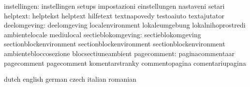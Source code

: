              instellingen: instellingen              setups
                           impostazioni              einstellungen
                           nastaveni                 setari
                 helptext: helptekst                 helptext
                           hilfetext                 textnapovedy
                           testoaiuto                textajutator
             deelomgeving: deelomgeving              localenvironment
                           lokaleumgebung            lokalnihoprostredi
                           ambientelocale            mediulocal
       sectieblokomgeving: sectieblokomgeving        sectionblockenvironment
                           sectionblockenvironment   sectionblockenvironment
                           ambientebloccosezione     blocsectiuneambient %
              pagecomment: paginacommentaar          pagecomment
                           pagecomment               komentarstranky
                           commentopagina            comentariupagina %

\stopvariables




\startvariables            dutch                     english
                           german                    czech
                           italian                   romanian


